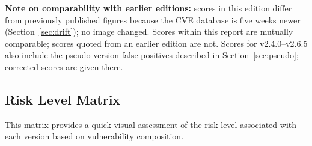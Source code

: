 \documentclass{article}
\begin{document}
\noindent\textbf{Note on comparability with earlier editions:} scores in this edition differ from previously published figures because the CVE database is five weeks newer (Section~\ref{sec:drift}); no image changed. Scores within this report are mutually comparable; scores quoted from an earlier edition are not. Scores for v2.4.0--v2.6.5 also include the pseudo-version false positives described in Section~\ref{sec:pseudo}; corrected scores are given there.

\subsection{Risk Level Matrix}

This matrix provides a quick visual assessment of the risk level associated with each version based on vulnerability composition.
\end{document}
